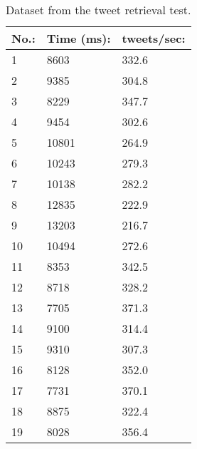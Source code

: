 \begin{table}[H]\centering
\begin{tabular}{|l|l|l|}\hline
\textbf{No.:}	&	\textbf{Time (ms):}	&	\textbf{tweets/sec:} \\\hline
1	&	8603	&	332.6	\\\hline
2	&	9385	&	304.8	\\\hline
3	&	8229	&	347.7	\\\hline
4	&	9454	&	302.6	\\\hline
5	&	10801	&	264.9	\\\hline
6	&	10243	&	279.3	\\\hline
7	&	10138	&	282.2	\\\hline
8	&	12835	&	222.9	\\\hline
9	&	13203	&	216.7	\\\hline
10	&	10494	&	272.6	\\\hline
11	&	8353	&	342.5	\\\hline
12	&	8718	&	328.2	\\\hline
13	&	7705	&	371.3	\\\hline
14	&	9100	&	314.4	\\\hline
15	&	9310	&	307.3	\\\hline
16	&	8128	&	352.0	\\\hline
17	&	7731	&	370.1	\\\hline
18	&	8875	&	322.4	\\\hline
19	&	8028	&	356.4	\\\hline
\end{tabular}
\caption{Dataset from the tweet retrieval test.}
\label{tab:tweetRet}
\end{table}


































